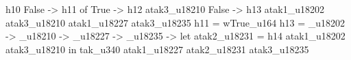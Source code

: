                                                                                                                                                                                                                                                    h10
                                                                                                                                                                                                                                                 False ->
                                                                                                                                                                                                                                                   h11 of
                                                                                                                                                                                                                                            True ->
                                                                                                                                                                                                                                              h12 atak3_u18210
                                                                                                                                                                                                                                            False ->
                                                                                                                                                                                                                                              h13 atak1_u18202 atak3_u18210 atak1_u18227 atak3_u18235
                                                                                                                                                h11 = wTrue_u164
                                                                                                                                                h13 = _u18202 -> _u18210 -> _u18227 -> _u18235 -> let
                                                                                                                                                                                                                            atak2_u18231 = h14 atak1_u18202 atak3_u18210
                                                                                                                                                                                                                          in tak_u340 atak1_u18227 atak2_u18231 atak3_u18235
